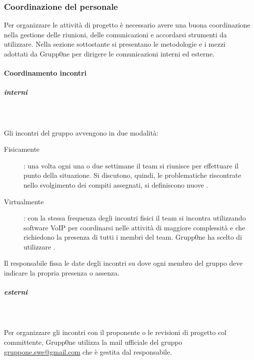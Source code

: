 \documentclass[../norme-di-progetto.tex]{subfiles}
\begin{document}
\subsubsection{Coordinazione del personale}
\label{subs:coordinazione del personale}
Per organizzare le attività di progetto è necessario avere una buona coordinazione nella gestione delle riunioni, delle comunicazioni e accordarsi strumenti da utilizzare.
Nella sezione sottostante si presentano le metodologie e i mezzi adottati da Grupp0ne per dirigere le comunicazioni interni ed esterne.
\paragraph{Coordinamento incontri}
\label{par:coordinamento incontri}
\subparagraph{interni}\mbox{}\\
\label{subp:interni}
\\Gli incontri del gruppo avvengono in due modalità:
\begin{description}
  \item [Fisicamente]: una volta ogni una o due settimane il team si riunisce per effettuare il punto della situazione. Si discutono, quindi, le problematiche riscontrate nello svolgimento dei compiti assegnati, si definiscono nuove .
  \item [Virtualmente]: con la stessa frequenza degli incontri fisici il team si incontra utilizzando software VoIP per coordinarsi nelle attività di maggiore complessità e che richiedono la presenza di tutti i membri del team. Grupp0ne ha scelto di utilizzare .
\end{description}
Il responsabile fissa le date degli incontri su  dove ogni membro del gruppo deve indicare la propria presenza o assenza.

\subparagraph{esterni}\mbox{}\\
\label{subp:esterni}
\\Per organizzare gli incontri con il proponente o le revisioni di progetto col committente, Grupp0ne utilizza la mail ufficiale del gruppo \url{gruppone.swe@gmail.com} che è gestita dal responsabile.
\end{document}
